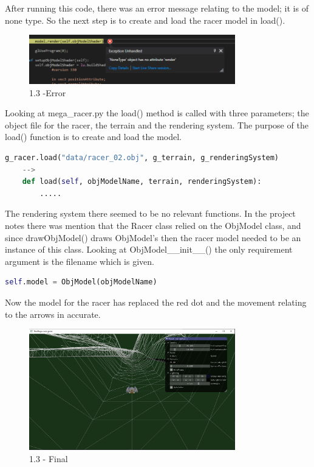 \documentclass[a4 paper, 12pt]{article}
\begin{document}
After running this code, there was an error message relating to the model; it is of none type. So the next step is to create and load the racer model in load(). 
    \begin{figure} [H]
        \centering
        \includegraphics[width=0.8\textwidth, frame]
            {./images/1.3_a.PNG}
        \caption{1.3 -Error}
    \end{figure}

Looking at mega\_racer.py the load() method is called with three parameters; the object file for the racer, the terrain and the rendering system. The purpose of the load() function is to create and load the model. 
    \begin{lstlisting}[language=python]
    g_racer.load("data/racer_02.obj", g_terrain, g_renderingSystem)
    -->
    def load(self, objModelName, terrain, renderingSystem):
        .....    
    \end{lstlisting}

The rendering system there seemed to be no relevant functions. In the project notes there was mention that the Racer class relied on the ObjModel class, and since drawObjModel() draws ObjModel's then the racer model needed to be an instance of this class. Looking at ObjModel\_\_init\_\_() the only requirement argument is the filename which is given.
    \begin{lstlisting}[language=python]
    self.model = ObjModel(objModelName)
    \end{lstlisting}   

Now the model for the racer has replaced the red dot and the movement relating to the arrows in accurate.
\begin{figure} [H]
    \centering
    \includegraphics[width=0.8\textwidth, frame]
        {./images/1.3_b.PNG}
    \caption{1.3 - Final}
\end{figure}
\end{document}

